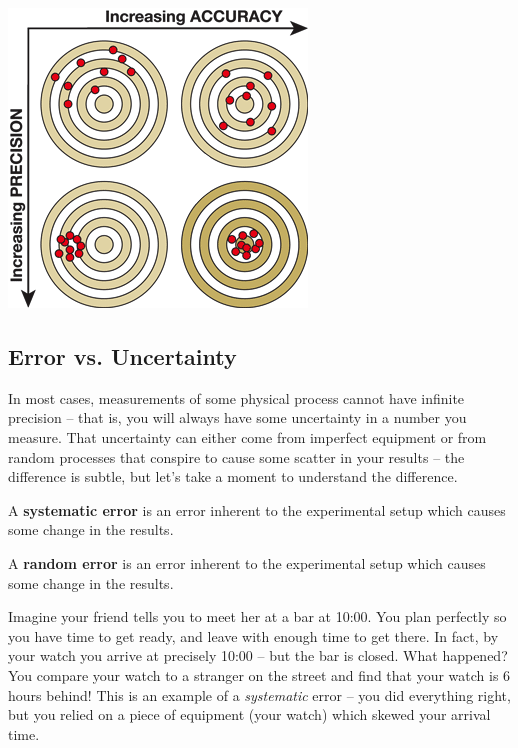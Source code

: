 \documentclass[12pt]{article}
\begin{document}
\begin{center}
	\includegraphics[scale=0.5]{precision_accuracy.png}
\end{center}

\subsection{Error vs. Uncertainty}

\indent\indent In most cases, measurements of some physical process cannot have infinite precision -- that is, you will always have some uncertainty in a number you measure. That uncertainty can either come from imperfect equipment or from random processes that conspire to cause some scatter in your results -- the difference is subtle, but let's take a moment to understand the difference. 
\begin{description}
	\item A \textbf{systematic error} is an error inherent to the experimental setup which causes some change in the results.
	\item A \textbf{random error} is an error inherent to the experimental setup which causes some change in the results.
\end{description}

Imagine your friend tells you to meet her at a bar at 10:00. You plan perfectly so you have time to get ready, and leave with enough time to get there. In fact, by your watch you arrive at precisely 10:00 -- but the bar is closed. What happened? You compare your watch to a stranger on the street and find that your watch is 6 hours behind! This is an example of a \emph{systematic} error -- you did everything right, but you relied on a piece of equipment (your watch) which skewed your arrival time.
\end{document}

